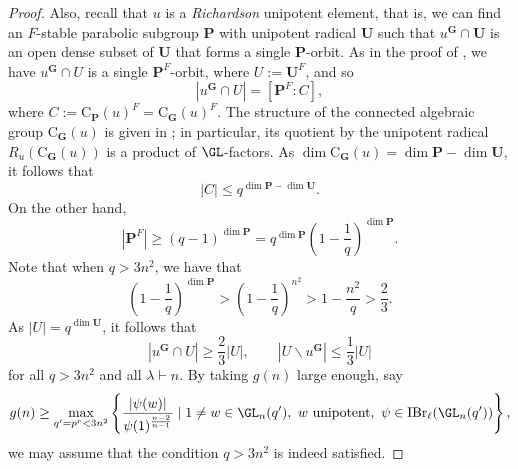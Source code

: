 \documentclass[eqthmnum,nocolour,skinny]{jt-calcs}
\newcommand{\GC}{\mathbf {G}}
\newcommand{\UC}{\mathbf {U}}
\newcommand{\PC}{\mathbf {P}}
\newcommand{\lam}{\lambda}
\newcommand{\CB}{\mathrm {C}}
\newcommand{\IBR}{\mathrm {IBr}}
\begin{document}
\begin{proof}
Also, recall that $u$ is a {\it Richardson} unipotent element, that is, we can find an $F$-stable parabolic subgroup
$\PC$ with unipotent radical $\UC$ such that $u^\GC \cap \UC$ is an open dense subset of $\UC$ that forms
a single $\PC$-orbit. As in the proof of \cite[Thm.~3.3]{bezrukavnikov-liebeck-shalev-tiep:2017:character-bounds-grps-Lie-type},
we have $u^\GC \cap U$ is a single $\PC^F$-orbit, where $U :=\UC^F$, and so
\begin{equation*}
|u^\GC \cap U| = [\PC^F:C],
\end{equation*}
where $C := \CB_\PC(u)^F = \CB_\GC(u)^F$. The structure of the connected algebraic group $\CB_\GC(u)$ is given in
\cite[Thm.~3.1]{LS}; in particular, its quotient by the unipotent radical $R_u(\CB_\GC(u))$ is a product of $\GL$-factors. As $\dim\CB_\GC(u) = \dim\PC-\dim\UC$, 
it follows that
\begin{equation*}
|C| \leq q^{\dim \PC-\dim \UC}.
\end{equation*}
On the other hand,
\begin{equation*}
|\PC^F| \geq (q-1)^{\dim \PC} = q^{\dim \PC}\left(1-\frac{1}{q}\right)^{\dim \PC}.
\end{equation*}
Note that when $q > 3n^2$, we have that
\begin{equation*}
\left(1-\frac{1}{q}\right)^{\dim \PC} > \left(1-\frac{1}{q}\right)^{n^2} > 1- \frac{n^2}{q} > \frac{2}{3}.
\end{equation*}
As $|U| = q^{\dim \UC}$, it follows that
\begin{equation}\label{for-u}
  |u^\GC \cap U| \geq \frac{2}{3}|U|, \qquad |U \smallsetminus u^\GC| \leq \frac{1}{3}|U|
\end{equation}
for all $q > 3n^2$ and all $\lam \vdash n$. By taking $g(n)$ large enough, say
\begin{equation}\label{for-g2}
  g(n) \geq \max_{q'= p^r < 3n^2} \left\{ \frac{|\psi(w)|}{\psi(1)^{\frac{n-2}{n-1}}} \mid 1 \neq w \in \GL_n(q'),~w \mbox{ unipotent},~\psi \in \IBR_\ell(\GL_n(q'))
    \right\},
\end{equation}
we may assume that the condition $q > 3n^2$ is indeed satisfied.


\end{proof}
\end{document}
